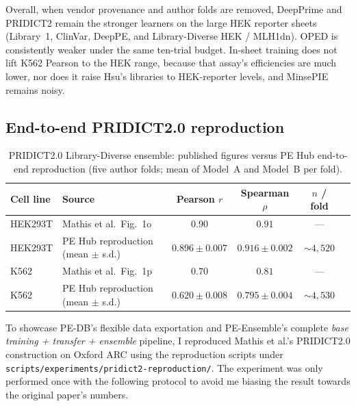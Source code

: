 \documentclass{article}
\begin{document}
Overall, when vendor provenance and author folds are removed, DeepPrime and PRIDICT2 remain the stronger learners on the large HEK reporter sheets (Library~1, ClinVar, DeepPE, and Library-Diverse HEK / MLH1dn). OPED is consistently weaker under the same ten-trial budget. In-sheet training does not lift K562 Pearson to the HEK range, because that assay's efficiencies are much lower, nor does it raise Hsu's libraries to HEK-reporter levels, and MinsePIE remains noisy. 

\subsection{End-to-end PRIDICT2.0 reproduction}

\begin{table}[ht]
    \centering
    \small
    \begin{tabular}{@{}llcccc@{}}
        \hline
        Cell line & Source & Pearson $r$ & Spearman $\rho$ & $n$ / fold \\
        \hline
        HEK293T & Mathis et al.\ Fig.~1o & $0.90$ & $0.91$ & --- \\
        HEK293T & PE Hub reproduction (mean $\pm$ s.d.) & $0.896 \pm 0.007$ & $0.916 \pm 0.002$ & ${\sim}4{,}520$ \\
        K562 & Mathis et al.\ Fig.~1p & $0.70$ & $0.81$ & --- \\
        K562 & PE Hub reproduction (mean $\pm$ s.d.) & $0.620 \pm 0.008$ & $0.795 \pm 0.004$ & ${\sim}4{,}530$ \\
        \hline
    \end{tabular}
    \caption{PRIDICT2.0 Library-Diverse ensemble: published figures versus PE Hub end-to-end reproduction (five author folds; mean of Model~A and Model~B per fold).}
    \label{tab:pridict2-repro}
\end{table}

To showcase PE-DB's flexible data exportation and  PE-Ensemble's complete \emph{base training + transfer + ensemble} pipeline, I reproduced Mathis et al.'s PRIDICT2.0 construction on Oxford ARC using the reproduction scripts under \nolinkurl{scripts/experiments/pridict2-reproduction/}\cite{mathisMachineLearningPrediction2024}. The experiment was only performed once with the following protocol to avoid me biasing the result towards the original paper's numbers.
\end{document}
